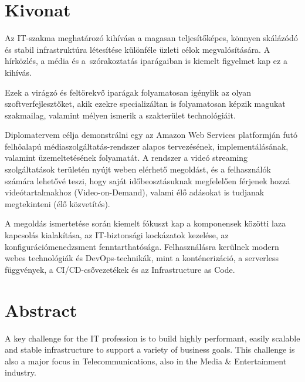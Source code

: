 \setcounter{page}{1}

\selecthungarian

\chapter*{Kivonat}

Az IT-szakma meghatározó kihívása a magasan teljesítőképes, könnyen skálázódó és stabil infrastruktúra létesítése különféle üzleti célok megvalósítására. A hírközlés, a média és a~szórakoztatás iparágaiban is kiemelt figyelmet kap ez a kihívás.

Ezek a virágzó és feltörekvő iparágak folyamatosan igénylik az olyan szoftverfejlesztőket, akik ezekre specializáltan is folyamatosan képzik magukat szakmailag, valamint mélyen ismerik a szakterület technológiáit.

Diplomatervem célja demonstrálni egy az Amazon Web Services platformján futó felhőalapú médiaszolgáltatás-rendszer alapos tervezésének, implementálásának, valamint üzemeltetésének folyamatát. A rendszer a videó streaming szolgáltatások területén nyújt weben elérhető megoldást, és a felhasználók számára lehetővé teszi, hogy saját időbeosztásuknak megfelelően férjenek hozzá videótartalmakhoz (Video-on-Demand), valami élő adásokat is tudjanak megtekinteni (élő közvetítés).

A megoldás ismertetése során kiemelt fókuszt kap a komponensek közötti laza kapcsolás kialakítása, az IT-biztonsági kockázatok kezelése, az konfigurációmenedzsment fenntarthatósága. Felhasználásra kerülnek modern webes technológiák és DevOps-technikák, mint a konténerizáció, a serverless függvények, a CI/CD-csővezetékek és az Infrastructure as Code.

\vfill
\selectenglish

\chapter*{Abstract}

A key challenge for the IT profession is to build highly performant, easily scalable and stable infrastructure to support a variety of business goals. This challenge is also a major focus in Telecommunications, also in the Media \& Entertainment industry.

